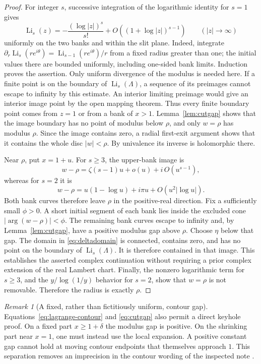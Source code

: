 \documentclass[11pt,a4paper]{article}
\numberwithin{equation}{section}
\theoremstyle{definition}
\theoremstyle{remark}
\newtheorem{remark}[theorem]{Remark}
\DeclareMathOperator{\Li}{Li}
\begin{document}
\begin{proof}
For integer \(s\), successive integration of the logarithmic
identity for \(s=1\) gives
\[
 \Li_s(z)=-\frac{(\log|z|)^s}{s!}
             +O((1+\log|z|)^{s-1})
 \qquad (|z|\to\infty)
\]
uniformly on the two banks and within the slit plane.
Indeed, integrate
\(\partial_r\Li_s(re^{i\theta})=\Li_{s-1}(re^{i\theta})/r\)
from a fixed radius greater than one; the initial values there are
bounded uniformly, including one-sided bank limits.  Induction proves
the assertion.  Only uniform divergence of the modulus is needed here.
If a finite point is on the boundary of \(\Li_s(\Lambda)\), a sequence
of its preimages cannot escape to infinity by this estimate.
An interior limiting preimage would give an interior image point by
the open mapping theorem.  Thus every finite boundary point comes
from \(z=1\) or from a bank of \(x>1\).
Lemma~\ref{lem:cutgap} shows that the image boundary has no point of
modulus below \(\rho\), and only \(w=\rho\) has modulus \(\rho\).
Since the image contains zero, a radial first-exit argument shows that
it contains the whole disc \(|w|<\rho\).  By univalence its inverse
is holomorphic there.

Near \(\rho\), put \(x=1+u\).
For \(s\ge3\), the upper-bank image is
\[
 w-\rho=\zeta(s-1)u+o(u)+
       i\,O(u^{s-1}),
\]
whereas for \(s=2\) it is
\[
 w-\rho=u(1-\log u)+i\pi u+O(u^2|\log u|).
\]
Both bank curves therefore leave \(\rho\) in the positive-real
direction.  Fix a sufficiently small \(\phi>0\).  A short initial
segment of each bank lies inside the excluded cone
\(|\arg(w-\rho)|<\phi\).  The remaining bank curves escape to infinity
and, by Lemma~\ref{lem:cutgap}, have a positive modulus gap above
\(\rho\).  Choose \(\eta\) below that gap.
The domain in \eqref{eq:deltadomain} is connected, contains zero, and
has no point on the boundary of \(\Li_s(\Lambda)\).  It is therefore
contained in that image.  This establishes the asserted complex
continuation without requiring a prior complex extension of the
real Lambert chart.
Finally, the nonzero logarithmic term for \(s\ge3\), and the
\(y/\log(1/y)\) behavior for \(s=2\), show that \(w=\rho\) is
not removable.  Therefore the radius is exactly \(\rho\).
\end{proof}

\begin{remark}[A fixed, rather than fictitiously uniform, contour gap]
Equations~\eqref{eq:lagrange-contour} and \eqref{eq:cutgap} also permit
a direct keyhole proof.  On a fixed part \(x\ge1+\delta\) the modulus
gap is positive.  On the shrinking part near \(x=1\), one must instead
use the local expansion.  A positive constant gap cannot hold at
moving contour endpoints that themselves approach \(1\).
This separation removes an imprecision in the contour wording of
the inspected note \cite{kr}.
\end{remark}
\end{document}

